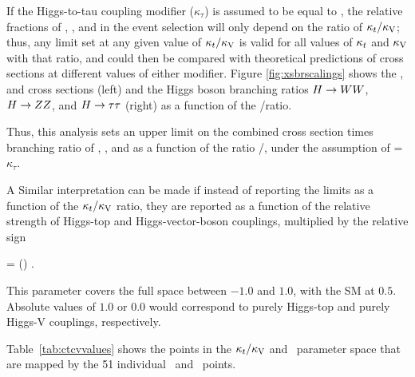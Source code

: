 If the Higgs-to-tau coupling modifier ($\kappa_\tau$) is assumed to be equal to \Ct, the relative fractions of \WW, \ZZ, and \tautau in the event selection will only depend on the ratio of $\kappa_t/\kappa_\text{V}$; thus, any limit set at any given value of $\kappa_t/\kappa_\text{V}$ is valid for all values of $\kappa_t$ and $\kappa_\text{V}$ with that ratio, and could then be compared with theoretical predictions of cross sections at different values of either modifier. Figure \ref{fig:xsbrscalings} shows the \tHq, \tHW and \ttH cross sections (left) and the Higgs boson branching ratios $ H\to WW$, $H\to ZZ$, and $H\to\tau\tau$ (right) as a function of the \Ct/\CV ratio. 

Thus, this analysis sets an upper limit on the combined cross section times branching ratio of \tHq, \tHW, and \ttH as a function of the ratio \Ct/\CV, under the assumption of \Ct=$\kappa_\tau$.

A Similar interpretation can be made if instead of reporting the limits as a function of the $\kappa_t/\kappa_\text{V}$ ratio, they are reported as a function of the relative strength of Higgs-top and Higgs-vector-boson couplings, multiplied by the relative sign

\beqn
\ft = \left(\frac{\Ct}{\CV}\right) \times {}.
\label{eq:ft}
\eeqn

This parameter covers the full space between $-1.0$ and $1.0$, with the SM at $0.5$. Absolute values of $1.0$ or $0.0$ would correspond to purely Higgs-top and purely Higgs-V couplings, respectively.

Table~\ref{tab:ctcvvalues} shows the points in the $\kappa_t/\kappa_\text{V}$ and \ft\ parameter space that are mapped by the 51 individual \Ct\ and \CV\ points.

